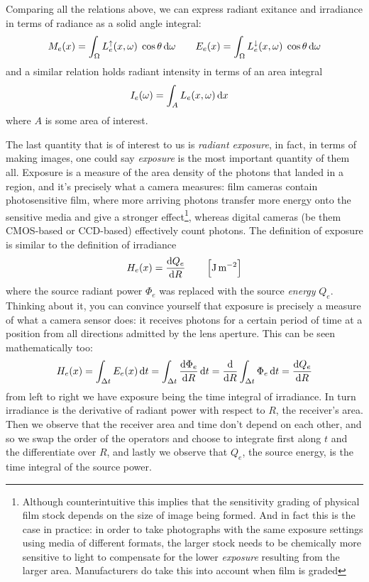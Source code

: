 Comparing all the relations above, we can express radiant exitance 
and irradiance in terms of radiance as a solid angle integral:
\begin{equation}
	M_e(x) = \int_\Omega L_e^\uparrow(x,\omega) \;\cos\theta \mathop{}\!\mathrm{d}\omega \qquad
	E_e(x) = \int_\Omega L_e^\downarrow(x,\omega) \;\cos\theta \mathop{}\!\mathrm{d}\omega
\end{equation}
and a similar relation holds radiant intensity in terms of an area integral
\begin{equation}
	I_e(\omega) = \int_A L_e(x,\omega) \mathop{}\!\mathrm{d} x \quad
\end{equation}
where $A$ is some area of interest.

The last quantity that is of interest to us is \textsl{radiant \gls{exposure}},
in fact, in terms of making images, one could say \emph{exposure} is the most important
quantity of them all. Exposure is a measure of the area density of
the photons that landed in a region, and it's precisely what a camera measures:
film cameras contain photosensitive film, where more arriving photons transfer more
energy onto the sensitive media and give a stronger effect\footnote{
	Although counterintuitive this implies that the sensitivity grading of physical film
	stock depends on the size of image being formed. And in fact this is the case in practice:
	in order to take photographs with the same exposure settings using media of different
	formats, the larger stock needs to be chemically more sensitive to light to compensate
	for the lower \textsl{exposure} resulting from the larger area.
	Manufacturers do take this into account when film is graded
}, whereas digital cameras (be them \gls{CMOS}-based or \gls{CCD}-based) effectively 
count photons. 
The definition of \gls{exposure} is similar to the definition of \gls{irradiance}
\begin{equation}
	H_e(x) = \frac{\d Q_e}{\d R} \qquad \left[\unit{\joule\per\square\meter}\right]
\end{equation}
where the source radiant power $\Phi_e$ was replaced with the source \emph{energy} $Q_e$.
Thinking about it, you can convince yourself that exposure is precisely a measure of what a camera
sensor does: it receives photons for a certain period of time at a position from all directions
admitted by the lens aperture.
This can be seen mathematically too:
\begin{equation}
	H_e(x) = \int_{\Delta t} E_e(x) \d t 
	       = \int_{\Delta t} \frac{\d\Phi_e}{\d R} \d t
	       = \frac{\d}{\d R} \int_{\Delta t} \Phi_e \d t
	       = \frac{\d Q_e }{\d R} 
\end{equation}
from left to right we have exposure being the time integral of irradiance. In turn irradiance
is the derivative of radiant power with respect to $R$, the receiver's area. Then we observe that
the receiver area and time don't depend on each other, and so we swap the order of the operators 
and choose to integrate first along $t$ and the differentiate over $R$, and lastly we observe 
that $Q_e$, the source energy, is the time integral of the source power.


